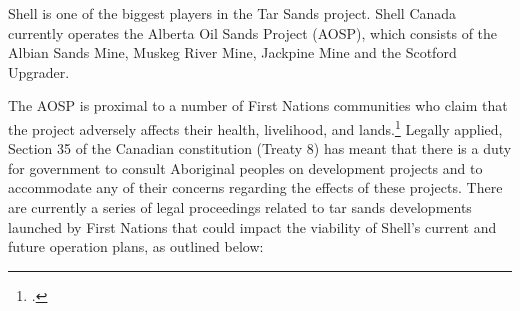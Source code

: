 Shell is one of the biggest players in the Tar Sands project. Shell Canada currently operates the Alberta Oil Sands Project (AOSP), which consists of the Albian Sands Mine, Muskeg River Mine, Jackpine Mine and the Scotford Upgrader. 



The AOSP is proximal to a number of First Nations communities who claim that the project adversely affects their health, livelihood, and lands.\footcite[][]{RiskingRuin_2012}  Legally applied, Section 35 of the Canadian constitution (Treaty 8) has meant that there is a duty for government to consult Aboriginal peoples on development projects and to accommodate any of their concerns regarding the effects of these projects. There are currently a series of legal proceedings related to tar sands developments launched by First Nations that could impact the viability of Shell’s current and future operation plans, as outlined below:
